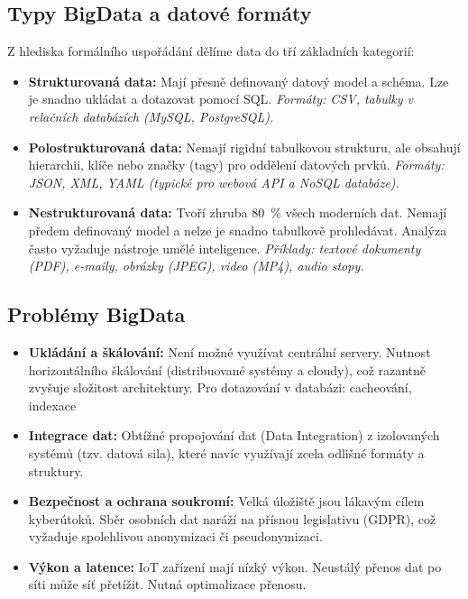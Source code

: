 \subsection{Typy BigData a datové formáty}
Z hlediska formálního uspořádání dělíme data do tří základních kategorií:
\begin{itemize}
    \item \textbf{Strukturovaná data:} Mají přesně definovaný datový model a schéma. Lze je snadno ukládat a dotazovat pomocí SQL. \textit{Formáty: CSV, tabulky v relačních databázích (MySQL, PostgreSQL).}
    \item \textbf{Polostrukturovaná data:} Nemají rigidní tabulkovou strukturu, ale obsahují hierarchii, klíče nebo značky (tagy) pro oddělení datových prvků. \textit{Formáty: JSON, XML, YAML (typické pro webová API a NoSQL databáze).}
    \item \textbf{Nestrukturovaná data:} Tvoří zhruba 80~\% všech moderních dat. Nemají předem definovaný model a nelze je snadno tabulkově prohledávat. Analýza často vyžaduje nástroje umělé inteligence. \textit{Příklady: textové dokumenty (PDF), e-maily, obrázky (JPEG), video (MP4), audio stopy.}
\end{itemize}

\subsection{Problémy BigData}
\begin{itemize}
    \item \textbf{Ukládání a škálování:} Není možné využívat centrální servery. Nutnost horizontálního škálování (distribuované systémy a cloudy), což razantně zvyšuje složitost architektury. Pro dotazování v databázi: cacheování, indexace
    \item \textbf{Integrace dat:} Obtížné propojování dat (Data Integration) z izolovaných systémů (tzv. datová sila), které navíc využívají zcela odlišné formáty a struktury.
    \item \textbf{Bezpečnost a ochrana soukromí:} Velká úložiště jsou lákavým cílem kyberútoků. Sběr osobních dat naráží na přísnou legislativu (GDPR), což vyžaduje spolehlivou anonymizaci či pseudonymizaci.
    \item \textbf{Výkon a latence:} IoT zařízení mají nízký výkon. Neustálý přenos dat po síti může síť přetížit. Nutná optimalizace přenosu.
\end{itemize}

\newpage

